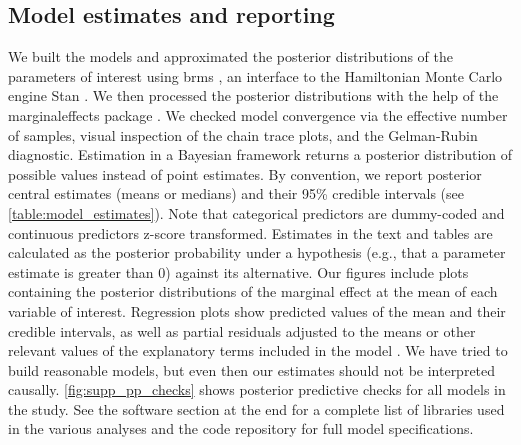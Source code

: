 \documentclass[9pt, onecolumn, twoside, lineno]{gsajnl}
\begin{document}
\subsection{Model estimates and reporting}

We built the models and approximated the posterior distributions of the parameters of interest using brms \autocite{brms2017}, an interface to the Hamiltonian Monte Carlo engine Stan \autocite{stan2023}. We then processed the posterior distributions with the help of the marginaleffects package \autocite{marginaleffects}. We checked model convergence via the effective number of samples, visual inspection of the chain trace plots, and the Gelman-Rubin diagnostic. Estimation in a Bayesian framework returns a posterior distribution of possible values instead of point estimates. By convention, we report posterior central estimates (means or medians) and their 95\% credible intervals (see \autoref{table:model_estimates}). Note that categorical predictors are dummy-coded and continuous predictors z-score transformed. Estimates in the text and tables are calculated as the posterior probability under a hypothesis (e.g., that a parameter estimate is greater than 0) against its alternative. Our figures include plots containing the posterior distributions of the marginal effect at the mean of each variable of interest. Regression plots show predicted values of the mean and their credible intervals, as well as partial residuals adjusted to the means or other relevant values of the explanatory terms included in the model \autocite{fox2018, larsen1972}. We have tried to build reasonable models, but even then our estimates should not be interpreted causally. \autoref{fig:supp_pp_checks} shows posterior predictive checks for all models in the study. See the software section at the end for a complete list of libraries used in the various analyses and the code repository for full model specifications.
\end{document}
